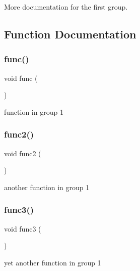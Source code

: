 More documentation for the first group. 

\subsection{Function Documentation}
\mbox{\label{group__group1_ga24f647174760cac13d2624b5ad74b00c}} 
\subsubsection{\texorpdfstring{func()}{func()}}
{\footnotesize\ttfamily void func (\begin{DoxyParamCaption}{ }\end{DoxyParamCaption})}

function in group 1 \mbox{\label{group__group1_ga053929c0809a5f56f7548fd7d9968f31}} 
\subsubsection{\texorpdfstring{func2()}{func2()}}
{\footnotesize\ttfamily void func2 (\begin{DoxyParamCaption}{ }\end{DoxyParamCaption})}

another function in group 1 \mbox{\label{group__group1_gadbf675591ff057ec48ce35b0d5cdf755}} 
\subsubsection{\texorpdfstring{func3()}{func3()}}
{\footnotesize\ttfamily void func3 (\begin{DoxyParamCaption}{ }\end{DoxyParamCaption})}

yet another function in group 1 